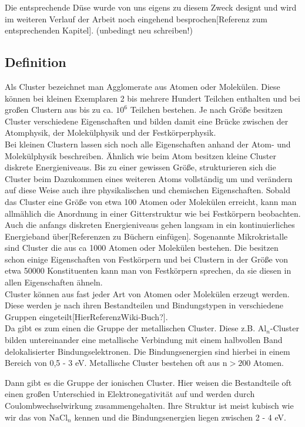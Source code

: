  Die entsprechende Düse wurde von uns eigens zu diesem Zweck designt und wird im weiteren Verlauf der Arbeit noch eingehend besprochen[Referenz zum entsprechenden Kapitel].
(unbedingt neu schreiben!)


\subsection{Definition}
Als Cluster bezeichnet man Agglomerate aus Atomen oder Molekülen. Diese können bei kleinen Exemplaren 2 bis mehrere Hundert Teilchen enthalten und bei großen Clustern aus bis zu ca. $\mathrm{10^6}$ Teilchen bestehen. Je nach Größe besitzen Cluster verschiedene Eigenschaften und bilden damit eine Brücke zwischen der Atomphysik, der Molekülphysik und der Festkörperphysik.\\
Bei kleinen Clustern lassen sich noch alle Eigenschaften anhand der Atom- und Molekülphysik beschreiben. Ähnlich wie beim Atom besitzen kleine Cluster diskrete Energieniveaus.
Bis zu einer gewissen Größe, strukturieren sich die Cluster beim Dazukommen eines weiteren Atoms vollständig um und verändern auf diese Weise auch ihre physikalischen und chemischen Eigenschaften. Sobald das Cluster eine Größe von etwa 100 Atomen oder Molekülen erreicht, kann man allmählich die Anordnung in einer Gitterstruktur wie bei Festkörpern beobachten. Auch die anfangs diskreten Energieniveaus gehen langsam in ein kontinuierliches Energieband über[Referenzen zu Büchern einfügen].
Sogenannte Mikrokristalle sind Cluster die aus ca 1000 Atomen oder Molekülen bestehen. Die besitzen schon einige Eigenschaften von Festkörpern und bei Clustern in der Größe von etwa 50000 Konstituenten kann man von Festkörpern sprechen, da sie diesen in allen Eigenschaften ähneln. \\

Cluster können aus fast jeder Art von Atomen oder Molekülen erzeugt werden. Diese werden je nach ihren Bestandteilen und Bindungstypen in verschiedene Gruppen eingeteilt[HierReferenzWiki-Buch?]. \\

Da gibt es zum einen die Gruppe der metallischen Cluster. Diese z.B. $\mathrm{Al}_n$-Cluster bilden untereinander eine metallische Verbindung mit einem halbvollen Band delokalisierter Bindungselektronen. Die Bindungsenergien sind hierbei in einem Bereich von 0,5 - 3 eV. Metallische Cluster bestehen oft aus $\mathrm{n > 200}$ Atomen.

Dann gibt es die Gruppe der ionischen Cluster. Hier weisen die Bestandteile oft einen großen Unterschied in Elektronegativität auf und werden durch Coulombwechselwirkung zusammengehalten. Ihre Struktur ist meist kubisch wie wir das von $\mathrm{NaCl}_n$ kennen und die Bindungsenergien liegen zwischen 2 - 4 eV. 

